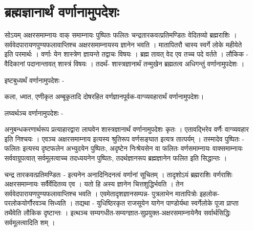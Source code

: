\section*{ब्रह्मज्ञानार्थं वर्णानामुपदेशः}	

सोऽयम् अक्षरसमाम्नायः वाक् समाम्नायः पुष्पितः फलितः चन्द्रतारकवत्प्रतिमण्डितः वेदितव्यो ब्रह्मराशिः । सर्ववेदपारायणपुण्यफलावाप्तिश्च अक्षरसमाम्नायस्य ज्ञानेन भवति । मातापितरौ चास्य स्वर्गे लोके महीयेते इति परमार्थः । वर्णाः येन शास्त्रेण ज्ञायन्ते तद्वाचः विषयः । ब्रह्म तावत् वेद एव तच्च पदे वर्तते । लौकिक - वैदिकानां पदानान्तावत्  शास्त्रं विषयः । तदर्थं- शास्त्रज्ञानार्थं तन्मुखेन ब्रह्मतत्व अधिगन्तुं वर्णानामुपदेशः ।	

इष्टबुध्यर्थं वर्णानामुपदेशः -

कला, ध्मात, एणीकृत अम्बूकृतादि दोषरहित वर्णज्ञानपूर्वक-वाग्व्यवहारार्थं वर्णानामुपदेशः।

लघ्वर्थञ्च वर्णानामुपदेशः -	

अनुबन्धकरणार्थरूप प्रत्याहारद्वारा लाघवेन शास्त्रज्ञानार्थं वर्णानामुपदेशः कृतः । एतावद्भिरेव वर्णैः वाग्व्यवहार इति निश्चयः । एवञ्च अक्षरसमाम्नाय इत्यस्य श्रुतिरूप वर्णसङ्घात इत्यत्र तात्पर्यम् । तस्मादेव पुष्पितः - फलितः इत्यस्य दृष्टफलेन अभ्युदयेन पुष्पितः, अदृष्टेन निःश्रेयसेन  वा फलितः वर्णसमाम्नायः वाक्समाम्नायः सर्ववाग्रूपत्वात् सर्वमूलत्वाच्च तदध्ययनेन पुष्पितः, तदर्थज्ञानरूप ब्रह्मज्ञानेन फलित इति सिद्धान्तः ।

चन्द्र तारकवत्प्रतिमण्डितः  - इत्यनेन अनादिनिदनत्वं वर्णानां सूचितम् । तादृशोऽयं ब्रह्मराशिः वर्णराशिः अक्षरसमाम्नायः सर्वैर्वेदितव्य एव । यतो हि अस्य ज्ञानेन चित्तशुद्धिर्भवति । तेन सर्ववेदपारायणपुण्यफलावाप्तिश्च भवति । एवमेतादृशज्ञानसम्पन्न- पुत्रलाभेन मातापित्रोः इहलोक-परलोकयोर्गौरवञ्च सिध्यति । तद्यथा - युधिष्ठिरकृत राजसूयेन यागेन पाण्डोर्यथा स्वर्गेलोके पूजा प्राप्ता तथैवेति लौकिक दृष्टान्तः । इत्थञ्च सम्यगधीत-सम्यग्ज्ञात-सुप्रयुक्त-अक्षरसमाम्नायेनैव सर्वार्थसिद्धिः सर्वमूलत्वादिति शम् ।

